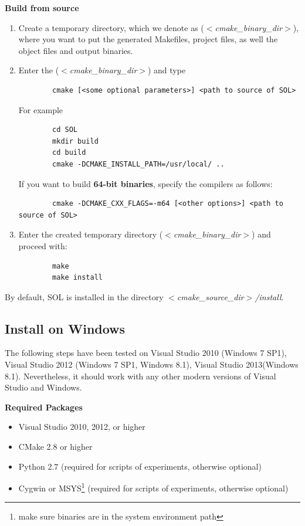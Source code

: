\documentclass[11pt,a4paper]{article}
\newlength{\wideitemsep}
\let\olditem\item
\renewcommand{\item}{\setlength{\itemsep}{\wideitemsep}\olditem}
\begin{document}
\hspace{-5mm}\textbf{Build from source}
\begin{enumerate}
    \item Create a temporary directory, which we denote as
        ($<$\emph{cmake\_binary\_dir}$>$), where you want to put the generated
        Makefiles, project files, as well the object files and output binaries.
    \item Enter the ($<$\emph{cmake\_binary\_dir}$>$) and type 
        \lstset{language=bash,
            framexleftmargin=-1.5cm,
        }
        \begin{lstlisting}
        cmake [<some optional parameters>] <path to source of SOL>
        \end{lstlisting}

        For example
        \lstset{language=bash,
        }
        \begin{lstlisting}
        cd SOL
        mkdir build
        cd build
        cmake -DCMAKE_INSTALL_PATH=/usr/local/ ..
        \end{lstlisting}

        If you want to build \textbf{64-bit binaries}, specify the compilers as follows:
        \lstset{language=bash}
        \begin{lstlisting}
        cmake -DCMAKE_CXX_FLAGS=-m64 [<other options>] <path to source of SOL>
        \end{lstlisting}

    \item Enter the created temporary directory ($<$\emph{cmake\_binary\_dir}$>$) and proceed with: 
        \lstset{language=bash}
        \begin{lstlisting}
        make 
        make install
        \end{lstlisting}
\end{enumerate}

By default, SOL is installed in the directory \emph{$<$cmake\_source\_dir$>$/install}.


\subsection{Install on Windows}
The following steps have been tested on Visual Studio 2010 (Windows 7 SP1), Visual Studio 2012 (Windows 7 SP1, Windows 8.1), Visual Studio 2013(Windows 8.1).
Nevertheless, it should work with any other modern versions of Visual Studio and Windows.

\vspace{2mm}\hspace{-5mm}\textbf{Required Packages}
\begin{itemize}
    \item Visual Studio 2010, 2012, or higher
    \item CMake 2.8 or higher
    \item Python 2.7 (required for scripts of experiments, otherwise optional)
    \item Cygwin or MSYS\footnote{make sure binaries are in the system
        environment path} (required for scripts of experiments, otherwise optional)
\end{itemize}
\end{document}
